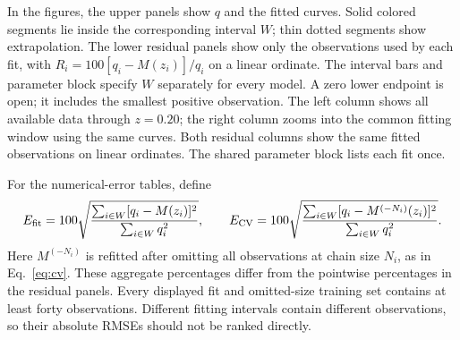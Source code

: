 In the figures, the upper panels show $q$ and the fitted curves.
Solid colored segments lie inside the corresponding interval $W$;
thin dotted segments show extrapolation. The lower residual panels
show only the observations used by each fit, with
$R_i=100[q_i-M(z_i)]/q_i$ on a linear ordinate. The interval bars and
parameter block specify $W$ separately for every model. A zero lower
endpoint is open; it includes the smallest positive observation.
The left column shows all available data through $z=0.20$; the
right column zooms into the common fitting window using the same
curves. Both residual columns show the same fitted observations on
linear ordinates. The shared parameter block lists each fit once.

For the numerical-error tables, define
\begin{equation}
 E_{\rm fit}=100\sqrt{\frac{\sum_{i\in W}[q_i-M(z_i)]^2}
                              {\sum_{i\in W}q_i^2}},\qquad
 E_{\rm CV}=100\sqrt{\frac{\sum_{i\in W}[q_i-M^{(-N_i)}(z_i)]^2}
                             {\sum_{i\in W}q_i^2}}.
 \label{eq:pair-errors}
\end{equation}
Here $M^{(-N_i)}$ is refitted after omitting all observations at chain
size $N_i$, as in Eq.~\eqref{eq:cv}. These aggregate percentages differ
from the pointwise percentages in the residual panels. Every displayed
fit and omitted-size training set contains at least forty observations.
Different fitting intervals contain different observations, so their
absolute RMSEs should not be ranked directly.

